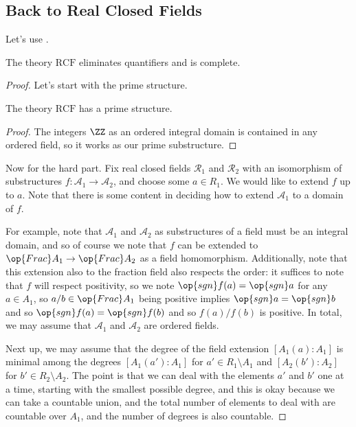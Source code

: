 \documentclass[../notes.tex]{subfiles}
\begin{document}
\subsection{Back to Real Closed Fields}
Let's use .
\begin{theorem}
	The theory $\mathrm{RCF}$ eliminates quantifiers and is complete.
\end{theorem}
\begin{proof}
	Let's start with the prime structure.
	\begin{lemma}
		The theory $\mathrm{RCF}$ has a prime structure.
	\end{lemma}
	\begin{proof}
		The integers $\ZZ$ as an ordered integral domain is contained in any ordered field, so it works as our prime substructure.
	\end{proof}
	Now for the hard part. Fix real closed fields $\mathcal R_1$ and $\mathcal R_2$ with an isomorphism of substructures $f\colon\mathcal A_1\to\mathcal A_2$, and choose some $a\in R_1$. We would like to extend $f$ up to $a$. Note that there is some content in deciding how to extend $\mathcal A_1$ to a domain of $f$.
	
	For example, note that $\mathcal A_1$ and $\mathcal A_2$ as substructures of a field must be an integral domain, and so of course we note that $f$ can be extended to $\op{Frac}A_1\to\op{Frac}A_2$ as a field homomorphism. Additionally, note that this extension also to the fraction field also respects the order: it suffices to note that $f$ will respect positivity, so we note $\op{sgn}f(a)=\op{sgn}a$ for any $a\in A_1$, so $a/b\in\op{Frac}A_1$ being positive implies $\op{sgn}a=\op{sgn}b$ and so $\op{sgn}f(a)=\op{sgn}f(b)$ and so $f(a)/f(b)$ is positive. In total, we may assume that $\mathcal A_1$ and $\mathcal A_2$ are ordered fields.

	Next up, we may assume that the degree of the field extension $[A_1(a):A_1]$ is minimal among the degrees $[A_1(a'):A_1]$ for $a'\in R_1\setminus A_1$ and $[A_2(b'):A_2]$ for $b'\in R_2\setminus A_2$. The point is that we can deal with the elements $a'$ and $b'$ one at a time, starting with the smallest possible degree, and this is okay because we can take a countable union, and the total number of elements to deal with are countable over $A_1$, and the number of degrees is also countable.


\end{proof}
\end{document}

